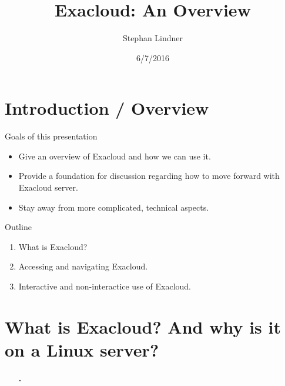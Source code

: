 \documentclass[12pt,t,xcolor=table]{beamer}
\author{Stephan Lindner}
\date{6/7/2016}
\title{Exacloud: An Overview}
\begin{document}
\maketitle

\section{Introduction / Overview}
\label{sec:orgheadline3}

\begin{frame}[label={sec:orgheadline1}]{Goals of this presentation}
\vspace{1em}

\begin{itemize}
\item Give an overview of Exacloud and how we can use it.\setlength\itemsep{0.5em}

\item Provide a foundation for discussion regarding how to move forward with Exacloud server.

\item Stay away from more complicated, technical aspects.
\end{itemize}
\end{frame}

\begin{frame}[label={sec:orgheadline2}]{Outline}
\vspace{1em}

\begin{enumerate}
\item What is Exacloud?\setlength\itemsep{0.5em}

\item Accessing and navigating Exacloud.

\item Interactive and non-interactice use of Exacloud.
\end{enumerate}
\end{frame}

\section{What is Exacloud? And why is it on a Linux server?}
\label{sec:orgheadline8}
\setcounter{section}{1}
\begin{frame}[c]{}
  \begin{itemize}
    \item[\bf\thesection.] \bf\insertsection
  \end{itemize}          
\end{frame}
\end{document}
